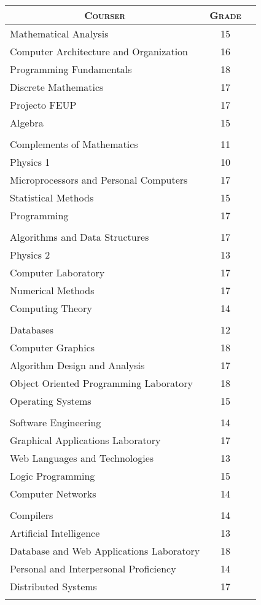 \documentclass[a4paper,10pt]{article} %
\begin{document}
\begin{center}
\begin{tabular}{lcc}
\multicolumn{1}{c}{\textsc{Courser}} & \textsc{Grade}\\ \hline
Mathematical Analysis & 15\\
Computer Architecture and Organization & 16\\
Programming Fundamentals & 18\\
Discrete Mathematics & 17\\
Projecto FEUP & 17\\
Algebra & 15\\ \\
Complements of Mathematics & 11\\
Physics 1 & 10\\
Microprocessors and Personal Computers & 17\\
Statistical Methods & 15\\	
Programming	 & 17\\ \\
Algorithms and Data Structures & 17\\
Physics 2 & 13\\
Computer Laboratory & 17\\
Numerical Methods & 17\\
Computing Theory & 14\\ \\
Databases & 12\\		
Computer Graphics & 18\\
Algorithm Design and Analysis & 17\\	
Object Oriented Programming Laboratory & 18\\
Operating Systems & 15\\ \\
Software Engineering & 14\\
Graphical Applications Laboratory & 17\\			
Web Languages and Technologies & 13\\
Logic Programming & 15\\
Computer Networks & 14\\ \\
Compilers & 14\\
Artificial Intelligence & 13\\
Database and Web Applications Laboratory & 18\\
Personal and Interpersonal Proficiency & 14\\
Distributed Systems & 17\\ \\

\end{tabular}
\end{center}
\end{document}
